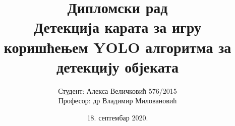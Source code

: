 % 
% 

\documentclass{beamer}


\usepackage[utf8]{inputenc}
\usepackage[T1, T2A]{fontenc}
\usepackage[serbianc]{babel}
\usepackage{datetime}

\usepackage[labelformat=empty]{caption}
\usepackage{amsmath}
\usepackage{mathtools}
\DeclarePairedDelimiter\ceil{\lceil}{\rceil}
\DeclarePairedDelimiter\floor{\lfloor}{\rfloor}
\usepackage{float}
\usepackage{minted}
\usepackage{verbatim}
\usepackage{cite}



\hypersetup{
    colorlinks=true,
    linkcolor=black,
    citecolor=black,
    filecolor=magenta,      
    urlcolor=cyan,
}
\makeatletter
\g@addto@macro\UrlBreaks{\do\-}
\makeatother



\title{\alert{Дипломски рад}\\
Детекција карата за игру коришћењем
YOLO алгоритма за детекцију објеката}
\date{18. септембар 2020.}
\author{\alert{Студент: Алекса Величковић 576/2015} \\
Професор: др Владимир Миловановић}




